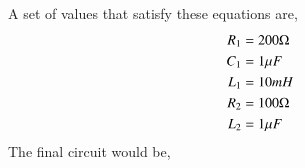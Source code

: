\begin{enumerate}[label=\thesection.\arabic*.,ref=\thesection.\theenumi]
A set of values that satisfy these equations are,
\begin{align}
R_1&= 200\ohm \\
C_1&= 1\mu F\\
L_1&= 10mH \\
R_2&= 100\ohm \\
L_2&=1 \mu F
\end{align}
The final circuit would be,
\begin{figure}[!ht]
	\begin{center}
		\resizebox{500}{150}{}
	\end{center}
\caption{}
\label{fig:ee18btech11006_6}
\end{figure}
\end{enumerate}
